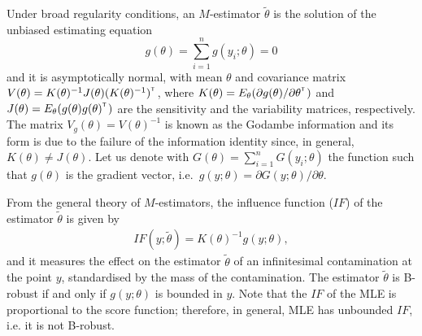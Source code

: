 \documentclass[preprint,12pt,authoryear]{elsarticle}
\def\T{{\footnotesize {^{_{\sf T}}}}}
\begin{document}
Under broad regularity conditions, an $M$-estimator $\tilde\theta$ is the solution of the unbiased estimating equation 
$$
g(\theta) =  \sum_{i=1}^n g(y_i;\theta) = 0
$$ 
and it is asymptotically normal, with mean $\theta$ and covariance matrix \linebreak
$V (\theta) = K(\theta)^{-1} J(\theta) (K(\theta)^{-1})^{\T}$, 
where $K(\theta) = E_\theta (\partial g(\theta)/\partial \theta^{\T})$ and $J(\theta) = E_\theta(g(\theta) g(\theta)^{\T} )$ are the sensitivity and the variability matrices, respectively.  The matrix $V_g(\theta) = V(\theta)^{-1}$ is known as the Godambe information and its form is due to the failure of the information identity since, in general, $K(\theta) \neq J(\theta)$. Let us denote with $G(\theta)=\sum_{i=1}^n G(y_i;\theta)$ the function such that $g(\theta)$ is the gradient vector, i.e.\ $g(y;\theta)=\partial G(y;\theta)/\partial \theta$.

From the general theory of $M$-estimators, the influence function ($IF$) of the estimator $\tilde\theta$ is given by
\begin{eqnarray}
IF (y;\tilde\theta) = K(\theta)^{-1} g(y;\theta), 
\label{ifsco}
\end{eqnarray}
and it measures the effect on the estimator $\tilde\theta$ of an infinitesimal contamination at the point $y$, standardised by the mass of the contamination. The estimator $\tilde\theta$ is B-robust if and only if $g(y;\theta)$ is bounded in $y$. Note that the $IF$ of the MLE is proportional to the score function; therefore, in general, MLE has unbounded $IF$, i.e. it is not B-robust. 
\end{document}
